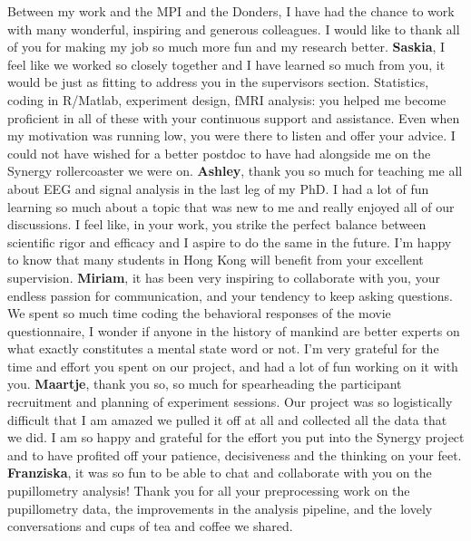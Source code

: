Between my work and the MPI and the Donders, I have had the chance to work with many wonderful, inspiring and generous colleagues. I would like to thank all of you for making my job so much more fun and my research better. \newline
\textbf{Saskia}, I feel like we worked so closely together and I have learned so much from you, it would be just as fitting to address you in the supervisors section. Statistics, coding in R/Matlab, experiment design, fMRI analysis: you helped me become proficient in all of these with your continuous support and assistance. Even when my motivation was running low, you were there to listen and offer your advice. I could not have wished for a better postdoc to have had alongside me on the Synergy rollercoaster we were on. \newline
\textbf{Ashley}, thank you so much for teaching me all about EEG and signal analysis in the last leg of my PhD. I had a lot of fun learning so much about a topic that was new to me and really enjoyed all of our discussions. I feel like, in your work, you strike the perfect balance between scientific rigor and efficacy and I aspire to do the same in the future. I'm happy to know that many students in Hong Kong will benefit from your excellent supervision. \newline
\textbf{Miriam}, it has been very inspiring to collaborate with you, your endless passion for communication, and your tendency to keep asking questions. We spent so much time coding the behavioral responses of the movie questionnaire, I wonder if anyone in the history of mankind are better experts on what exactly constitutes a mental state word or not. I'm very grateful for the time and effort you spent on our project, and had a lot of fun working on it with you. \newline
\textbf{Maartje}, thank you so, so much for spearheading the participant recruitment and planning of experiment sessions. Our project was so logistically difficult that I am amazed we pulled it off at all and collected all the data that we did. I am so happy and grateful for the effort you put into the Synergy project and to have profited off your patience, decisiveness and the thinking on your feet. \newline
\textbf{Franziska}, it was so fun to be able to chat and collaborate with you on the pupillometry analysis! Thank you for all your preprocessing work on the pupillometry data, the improvements in the analysis pipeline, and the lovely conversations and cups of tea and coffee we shared. \newline
